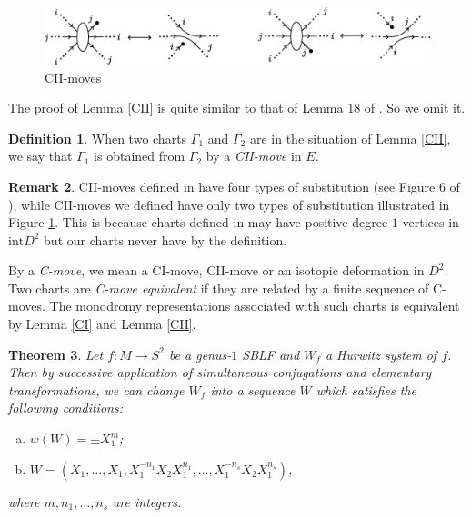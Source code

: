 \documentclass{amsart}
\theoremstyle{plain}
\newtheorem{thm}{Theorem}[section]
\theoremstyle{definition}
\newtheorem{defn}[thm]{Definition}
\newtheorem{rem}[thm]{Remark}
\begin{document}
\begin{figure}[htbp]
\begin{center}
\includegraphics[width=130mm]{CII-move.eps}
\end{center}
\caption{CII-moves}
\label{CII-move}
\end{figure}

The proof of Lemma \ref{CII} is quite similar to that of Lemma 18 of \cite{KMMW}. 
So we omit it. 

\begin{defn}

When two charts $\Gamma_1$ and $\Gamma_2$ are in the situation of Lemma \ref{CII}, we say that $\Gamma_1$ is obtained from $\Gamma_2$ by a {\it CII-move} in $E$. 

\end{defn}

\begin{rem}

CII-moves defined in \cite{KMMW} have four types of substitution (see Figure 6 of \cite{KMMW}), 
while CII-moves we defined have only two types of substitution illustrated in Figure \ref{CII-move}. 
This is because charts defined in \cite{KMMW} may have positive degree-$1$ vertices in $\text{int}D^2$ but our charts never have by the definition. 

\end{rem}

By a {\it C-move}, we mean a CI-move, CII-move or an isotopic deformation in $D^2$. 
Two charts are {\it C-move equivalent} if they are related by a finite sequence of C-moves. 
The monodromy representations associated with such charts is equivalent by Lemma \ref{CI} and Lemma \ref{CII}. 

\begin{thm}\label{main in chart sec}
Let $f:M\rightarrow S^2$ be a genus-$1$ SBLF and $W_f$ a Hurwitz system of $f$. 
Then by successive application of simultaneous conjugations and elementary transformations, we can change $W_f$ into a sequence $W$ which satisfies the following conditions: 
\begin{enumerate}[(a)]
\setlength{\itemindent}{10pt}
\item $w(W)=\pm X_1^m$; 

\item $W=(X_1,\ldots,X_1,X_1^{-n_1}X_2X_1^{n_1},\ldots,X_1^{-n_s}X_2X_1^{n_s})$, 

\end{enumerate}
\noindent
where $m,n_1,\ldots,n_s$ are integers. 

\end{thm}
\end{document}
